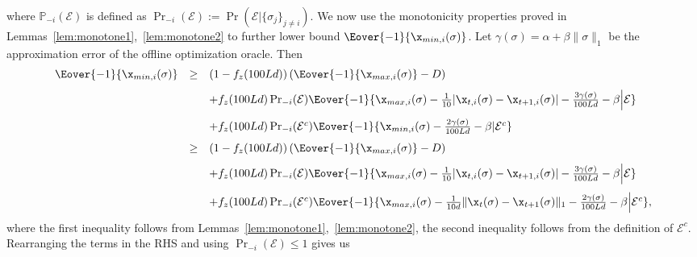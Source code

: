 where $\mathbb{P}_{-i}(\mathcal{E})$ is defined as $\Pr_{-i}(\mathcal{E}) := \Pr\left(\mathcal{E}\Big| \{\sigma_{j}\}_{j\neq i}\right).$ We now use the monotonicity properties proved in Lemmas~\ref{lem:monotone1},~\ref{lem:monotone2} to further lower bound $\Eover{-1}{\x_{min,i}(\sigma)}$. Let $\gamma(\sigma) = \alpha + \beta \|\sigma\|_{1}$ be the approximation error of the offline optimization oracle. Then
\begingroup\makeatletter\def\f@size{10}\check@mathfonts
\begin{equation*}
    \begin{array}{lll}
         \Eover{-1}{\x_{min,i}(\sigma)} &\geq&  \left(1-f_z(100Ld)\right)(\Eover{-1}{\x_{max, i}(\sigma)}-D)\vspace{0.1in}\\
         && + f_z(100Ld)\Pr_{-i}(\mathcal{E})\Eover{-1}{\x_{max,i}(\sigma) -\frac{1}{10}|\x_{t,i}(\sigma) - \x_{t+1,i}(\sigma)| - \frac{3\gamma(\sigma)}{100Ld}-\beta \Big| \mathcal{E}}\vspace{0.1in}\\
         && + f_z(100Ld)\Pr_{-i}(\mathcal{E}^c)\Eover{-1}{\x_{min,i}(\sigma) - \frac{2\gamma(\sigma)}{100Ld}-\beta| \mathcal{E}^c}\vspace{0.1in}\\
         &\geq& \left(1-f_z(100Ld)\right)(\Eover{-1}{\x_{max, i}(\sigma)}-D)\vspace{0.1in}\\
         && + f_z(100Ld)\Pr_{-i}(\mathcal{E})\Eover{-1}{\x_{max,i}(\sigma) -\frac{1}{10}|\x_{t,i}(\sigma) - \x_{t+1,i}(\sigma)|-\frac{3\gamma(\sigma)}{100Ld} -\beta\Big| \mathcal{E}}\vspace{0.1in}\\
         && + f_z(100Ld)\Pr_{-i}(\mathcal{E}^c)\Eover{-1}{\x_{max,i}(\sigma)-\frac{1}{10d}\|\x_{t}(\sigma)-\x_{t+1}(\sigma)\|_1 - \frac{2\gamma(\sigma)}{100Ld} -\beta\Big| \mathcal{E}^c},
    \end{array}
\end{equation*}
\endgroup
where the first inequality follows from Lemmas~\ref{lem:monotone1},~\ref{lem:monotone2}, the second inequality follows from the definition of $\mathcal{E}^c$. Rearranging the terms in the RHS and using $\Pr_{-i}(\mathcal{E}) \leq 1$ gives us 
